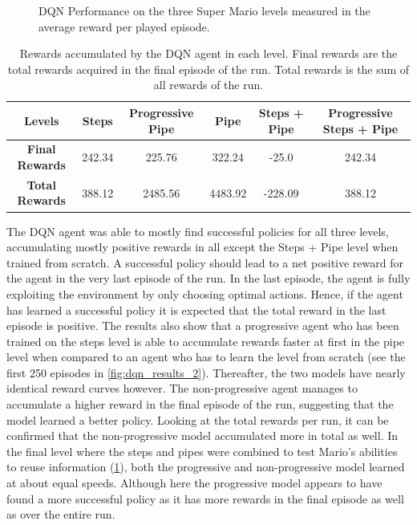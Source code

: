 \documentclass[notitlepage,a4paper,11pt]{article}
\begin{document}
\begin{figure}[t]
\begin{subfigure}[t]{0.32\textwidth}
         \caption{}
         \label{fig:dqn_results_3}
     \end{subfigure}
        \caption{DQN Performance on the three Super Mario levels measured in the average reward per played episode.}
        \label{fig:dqn_results}
\end{figure}

\begin{table}[h!]
\centering
\begin{tabular}{ |c|c|c|c|c|c| } 
	\hline
	\textbf{Levels} & Steps & Progressive Pipe & Pipe & Steps + Pipe & Progressive Steps + Pipe\\
	\hline
	\textbf{Final Rewards} & 242.34 & 225.76 & 322.24 & -25.0 & 242.34 \\
	\hline
	\textbf{Total Rewards} & 388.12 & 2485.56 & 4483.92 & -228.09 & 388.12 \\
	\hline
\end{tabular}
\caption{Rewards accumulated by the DQN agent in each level. Final rewards are the total rewards acquired in the final episode of the run. Total rewards is the sum of all rewards of the run.}
\end{table}

The DQN agent was able to mostly find successful policies for all three levels, accumulating mostly positive rewards in all except the Steps + Pipe level when trained from scratch. A successful policy should lead to a net positive reward for the agent in the very last episode of the run. In the last episode, the agent is fully exploiting the environment by only choosing optimal actions. Hence, if the agent has learned a successful policy it is expected that the total reward in the last episode is positive. The results also show that a progressive agent who has been trained on the steps level is able to accumulate rewards faster at first in the pipe level when compared to an agent who has to learn the level from scratch (see the first 250 episodes in \ref{fig:dqn_results_2}). Thereafter, the two models have nearly identical reward curves however. The non-progressive agent manages to accumulate a higher reward in the final episode of the run, suggesting that the model learned a better policy. Looking at the total rewards per run, it can be confirmed that the non-progressive model accumulated more in total as well. In the final level where the steps and pipes were combined to test Mario's abilities to reuse information (\ref{fig:dqn_results_3}), both the progressive and non-progressive model learned at about equal speeds. Although here the progressive model appears to have found a more successful policy as it has more rewards in the final episode as well as over the entire run.
\end{document}
